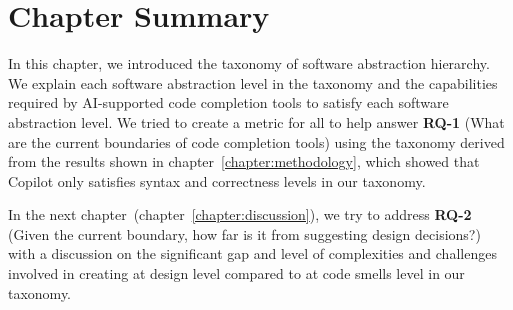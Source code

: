 \section{Chapter Summary}
In this chapter, we introduced the taxonomy of software abstraction hierarchy. We explain each software abstraction level in the taxonomy and the capabilities required by AI-supported code completion tools to satisfy each software abstraction level.
We tried to create a metric for all \cct{} to help answer \textbf{RQ-1} (What are the current boundaries of code completion tools) using the taxonomy derived from the results shown in chapter~\ref{chapter:methodology}, which showed that Copilot only satisfies syntax and correctness levels in our taxonomy.

In the next chapter~(chapter~\ref{chapter:discussion}), we try to address \textbf{RQ-2} (Given the current boundary, how far is it from suggesting design decisions?) with a discussion on the significant gap and level of complexities and challenges involved in creating \cct{} at design level compared to \cct{} at code smells level in our taxonomy.